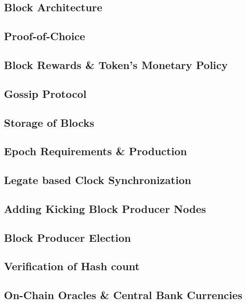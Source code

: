 \documentclass[letterpaper,11pt]{article}
\begin{document}
\subsection{Block Architecture}

\subsection{Proof-of-Choice}

\subsection{Block Rewards \& Token's Monetary Policy}
	
\subsection{Gossip Protocol}

\subsection{Storage of Blocks}
	
\subsection{Epoch Requirements \& Production}
	
\subsection{Legate based Clock Synchronization}
	
\subsection{Adding Kicking Block Producer Nodes}
	
\subsection{Block Producer Election}
	
\subsection{Verification of Hash count}

\subsection{On-Chain Oracles \& Central Bank Currencies}
	
\end{document}
